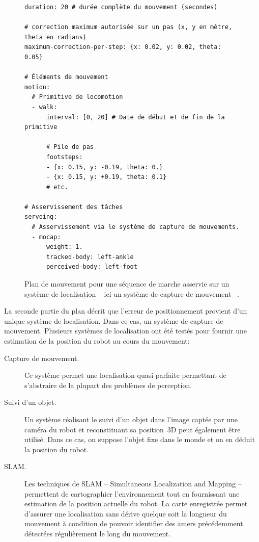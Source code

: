 \begin{figure}
  \begin{center}
\begin{verbatim}
duration: 20 # durée complète du mouvement (secondes)

# correction maximum autorisée sur un pas (x, y en mètre, theta en radians)
maximum-correction-per-step: {x: 0.02, y: 0.02, theta: 0.05}

# Éléments de mouvement
motion:
  # Primitive de locomotion
  - walk:
      interval: [0, 20] # Date de début et de fin de la primitive

      # Pile de pas
      footsteps:
      - {x: 0.15, y: -0.19, theta: 0.}
      - {x: 0.15, y: +0.19, theta: 0.1}
      # etc.

# Asservissement des tâches
servoing:
  # Asservissement via le système de capture de mouvements.
  - mocap:
      weight: 1.
      tracked-body: left-ankle
      perceived-body: left-foot
\end{verbatim}
  \end{center}
  \caption{Plan de mouvement pour une séquence de marche asservie sur
    un système de localisation -- ici un système de capture de
    mouvement --.\label{fig:plan_locomotion_asservie}}
\end{figure}

La seconde partie du plan décrit que l'erreur de positionnement
provient d'un unique système de localisation. Dans ce cas, un système
de capture de mouvement. Plusieurs systèmes de localisation ont été
testés pour fournir une estimation de la position du robot au cours du
mouvement:

\begin{description}
\item[Capture de mouvement.] Ce système permet une localisation
  quasi-parfaite permettant de s'abstraire de la plupart des problèmes
  de perception.
\item[Suivi d'un objet.] Un système réalisant le suivi d'un objet dans
  l'image captée par une caméra du robot et reconstituant sa
  position 3D peut également être utilisé. Dans ce cas, on suppose
  l'objet fixe dans le monde et on en déduit la position du robot.
\item[SLAM.] Les techniques de SLAM -- Simultaneous Localization and
  Mapping -- permettent de cartographier l'environnement tout en
  fournissant une estimation de la position actuelle du robot. La
  carte enregistrée permet d'assurer une localisation sans dérive
  quelque soit la longueur du mouvement à condition de pouvoir
  identifier des amers précédemment détectées régulièrement le long
  du mouvement.
\end{description}

